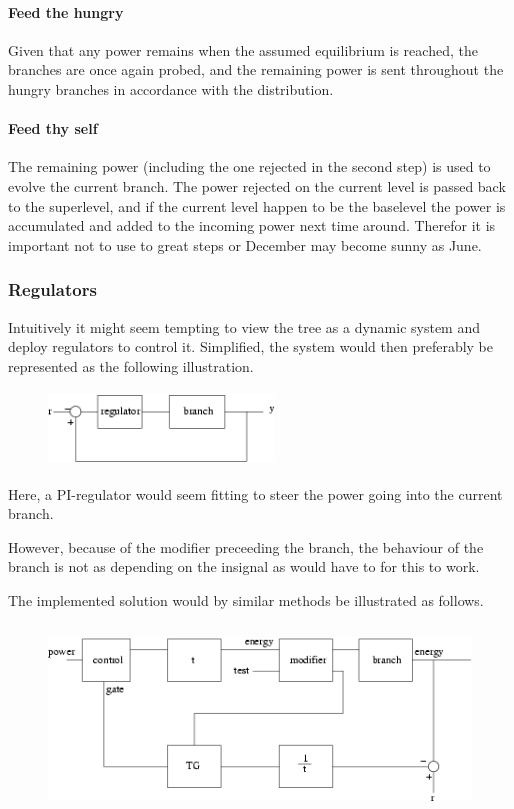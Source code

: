 \paragraph{Feed the hungry}
Given that any power remains when the assumed equilibrium is reached, the
branches are once again probed, and the remaining power is sent throughout the
hungry branches in accordance with the distribution.
\paragraph{Feed thy self}
The remaining power (including the one rejected in the second step) is used to
evolve the current branch. The power rejected on the current level is passed
back to the superlevel, and if the current level happen to be the baselevel
the power is accumulated and added to the incoming power next time around.
Therefor it is important not to use to great steps or December may become
sunny as June.

\subsubsection{Regulators}
Intuitively it might seem tempting to view the tree as a dynamic system and
deploy regulators to control it. Simplified, the system would then preferably be
represented as the following illustration.

\begin{figure}[htb]
        \centering
        \includegraphics[height=2cm,width=6cm, angle=0]{images/regulsimple}
        \label{fig:db:graph1}
\end{figure}

Here, a PI-regulator would seem fitting to steer the power going into the
current branch.

However, because of the modifier preceeding the branch, the behaviour of the branch 
is not as depending on the insignal as would have to for this to work.

The implemented solution would by similar methods be illustrated as follows.
 
\begin{figure}[htb]
        \centering
        \includegraphics[height=5cm,width=12cm, angle=0]{images/regulsys}
        \label{fig:db:graph2}
\end{figure}

